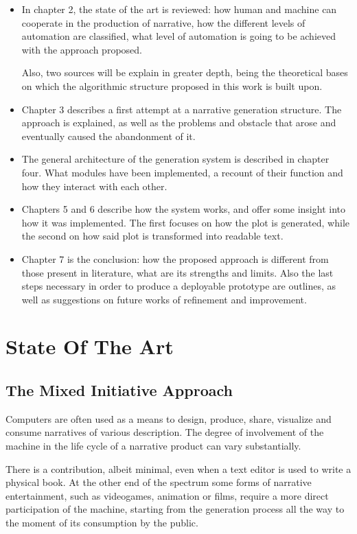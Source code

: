 \documentclass[12pt,a4paper,oneside]{report}
\begin{document}
\begin{itemize}\setlength{\itemsep}{8pt}
\item In chapter 2, the state of the art is reviewed: how human and machine can cooperate in the production of narrative, how the different levels of automation are classified, what level of automation is going to be achieved with the approach proposed.

Also, two sources will be explain in greater depth, being the theoretical bases on which the algorithmic structure proposed in this work is built upon.

\item Chapter 3 describes a first attempt at a narrative generation structure. The approach is explained, as well as the problems and obstacle that arose and eventually caused the abandonment of it.

\item The general architecture of the generation system is described in chapter four. What modules have been implemented, a recount of their function and how they interact with each other.

\item Chapters 5 and 6 describe how the system works, and offer some insight into how it was implemented. The first focuses on how the plot is generated, while the second on how said plot is transformed into readable text.

\item Chapter 7 is the conclusion: how the proposed approach is different from those present in literature, what are its strengths and limits. Also the last steps necessary in order to produce a deployable prototype are outlines, as well as suggestions on future works of refinement and improvement.
\end{itemize}

\chapter{State Of The Art}
\section{The Mixed Initiative Approach}

Computers are often used as a means to design, produce, share, visualize and consume narratives of various description. The degree of involvement of the machine in the life cycle of a narrative product can vary substantially.

There is a contribution, albeit minimal, even when a text editor is used to write a physical book. At the other end of the spectrum some forms of narrative entertainment, such as videogames, animation or films, require a more direct participation of the machine, starting from the generation process all the way to the moment of its consumption by the public.
\end{document}
